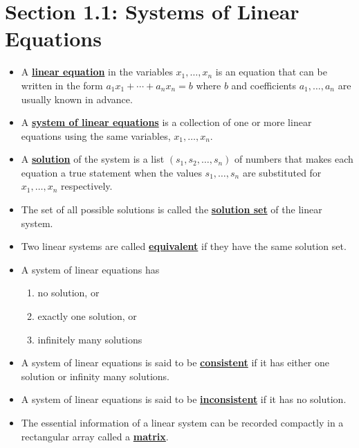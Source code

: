 \documentclass{article}
\newcommand{\definition}[1]{\underline{\textbf{#1}}}
\begin{document}
\section*{Section 1.1: Systems of Linear Equations}

\begin{itemize}

    \item A \definition{linear equation} in the variables $x_1,\ldots,x_n$ is an equation that can be written in the form $a_1 x_1 + \cdots + a_n x_n = b$
where $b$ and coefficients $a_1,\ldots,a_n$ are usually known in advance.

    \item A \definition{system of linear equations} is a collection of one or more linear equations using the same variables, $x_1, \ldots , x_n$.

    \item A \definition{solution} of the system is a list $(s_1, s_2, \ldots, s_n)$ of numbers that makes each equation a true statement when the values
    $s_1, \ldots, s_n$ are substituted for $x_1, \ldots, x_n$ respectively.

    \item The set of all possible solutions is called the \definition{solution set} of the linear system.

    \item Two linear systems are called \definition{equivalent} if they have the same solution set.

    \item A system of linear equations has 
        \begin{enumerate}
            \item no solution, or
            \item exactly one solution, or
            \item infinitely many solutions
        \end{enumerate}

    \item A system of linear equations is said to be \definition{consistent} if it has either one solution or infinity many solutions.

    \item A system of linear equations is said to be \definition{inconsistent} if it has no solution.

    \item The essential information of a linear system can be recorded compactly in a rectangular array called a \definition{matrix}.
    

\end{itemize}
\end{document}

